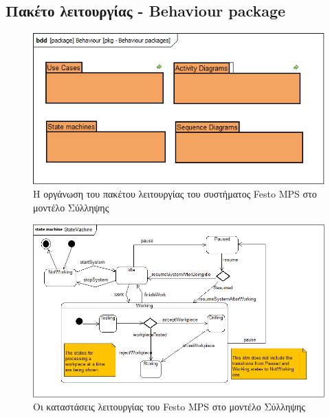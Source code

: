 \documentclass[a4paper,12pt,twoside]{report}
\begin{document}
\begin{appendices}
			\subsection{Πακέτο λειτουργίας - Behaviour package}

			\clearpage
				\begin{figure}[hp]
					\centering
					\includegraphics[scale=0.60]{ConceptionalModel_pkg-Behaviourpackages.png}
					\caption{Η οργάνωση του πακέτου λειτουργίας του συστήματος Festo MPS στο μοντέλο Σύλληψης}
					\label{φωτ: οργάνωση του πακέτου λειτουργίας του συστήματος Festo MPS στο μοντέλο Σύλληψης}
				\end{figure}
				\begin{figure}[hp]
					\centering
					\includegraphics[scale=0.45]{ConceptionalModel_stm-SystemsTopLevelStateMachines.png}
					\caption{Οι καταστάσεις λειτουργίας του Festo MPS στο μοντέλο Σύλληψης}
					\label{φωτ:Οι καταστάσεις λειτουργίας του Festo MPS στο μοντέλο Σύλληψης}
				\end{figure}
				\begin{figure}[hp]

\end{figure}
\end{appendices}
\end{document}
